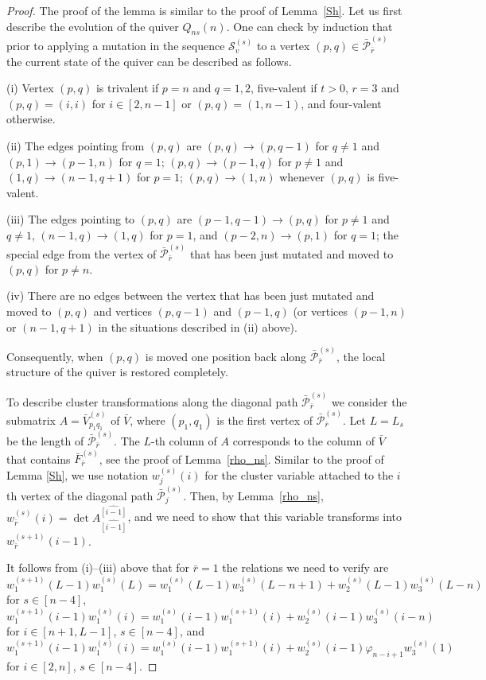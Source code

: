 \documentclass{amsart}
\theoremstyle{definition}
\theoremstyle{remark}
\numberwithin{equation}{section}
\numberwithin{theorem}{section}
\begin{document}
\begin{proof} The proof of the lemma is similar to the proof of Lemma~\ref{Sh}. 
Let us first describe the evolution of the quiver $Q_{ns}(n)$. One can check by induction that prior to 
applying a mutation in the sequence $\mathcal S_v^{(s)}$ to a vertex $(p,q)\in\bar{{\mathcal P}}_{\bar r}^{(s)}$ the current state of
the quiver can be described as follows.

(i) Vertex $(p,q)$ is trivalent if $p=n$ and $q=1,2$, five-valent if $t>0$, $r=3$ and $(p,q)=(i,i)$ for
$i\in[2,n-1]$ or $(p,q)=(1,n-1)$, and four-valent otherwise.

(ii) The edges pointing from $(p,q)$ are $(p,q)\to (p,q-1)$ for $q\ne 1$ and $(p,1)\to (p-1,n)$ for $q=1$;
$(p,q)\to (p-1,q)$ for $p\ne 1$ and $(1,q)\to (n-1,q+1)$ for $p=1$; $(p,q)\to (1,n)$ whenever $(p,q)$ is
five-valent.
 
(iii) The edges pointing to $(p,q)$ are $(p-1,q-1)\to(p,q)$ for $p\ne 1$ and  $q\ne 1$, 
$(n-1,q)\to(1,q)$ for $p=1$, and $(p-2,n)\to (p,1)$ 
for $q=1$; the special edge from the vertex of $\bar{{\mathcal P}}_{\bar r}^{(s)}$ that has been just mutated and moved to $(p,q)$ for $p\ne n$. 

(iv) There are no edges between the vertex that has been just mutated and moved to $(p,q)$ 
and vertices $(p,q-1)$ and $(p-1,q)$ (or vertices $(p-1,n)$ or $(n-1,
q+1)$ in the situations described in (ii) above).

Consequently, when $(p,q)$ is moved one position back along $\bar{{\mathcal P}}_{\bar r}^{(s)}$, the local structure of the quiver is restored completely. 
   
To describe cluster transformations along the diagonal path $\bar{{\mathcal P}}^{(s)}_{\bar r}$ we consider the  submatrix $A=\bar V_{p_1q_1}^{(s)}$ of $\bar V$, where $(p_1,q_1)$ is the first
vertex of $\bar{{\mathcal P}}_{\bar r}^{(s)}$.  Let $L=L_s$ be the length of $\bar{{\mathcal P}}^{(s)}_{\bar r}$.
 The $L$-th column of $A$ corresponds to 
the column of $\bar V$ that contains $\bar F_{\bar r}^{(s)}$, see the proof of Lemma~\ref{rho_ns}.
Similar to the proof of Lemma \ref{Sh}, we use notation $w^{(s)}_j(i)$ for  the cluster variable
attached to the $i$th vertex of the diagonal path $\bar{{\mathcal P}}^{(s)}_j$.
Then, by Lemma~\ref{rho_ns}, 
$w^{(s)}_{\bar r}(i)=\det A^{\widehat{[i-1]}}_{\widehat{[i-1]}}$, and we need
to show that this variable transforms into $w^{(s+1)}_{\bar r}(i-1)$.

It follows from (i)--(iii) above that for $\bar r=1$ the  relations we need to verify are
$$
w^{(s+1)}_1(L-1)  w^{(s)}_1(L) = w^{(s)}_1(L-1) w^{(s)}_3(L-n+1) +
w^{(s)}_2(L-1 ) w^{(s)}_3(L-n)
$$  
for $s\in [n-4]$,
\begin{equation}\label{probe}
w^{(s+1)}_1(i-1) w^{(s)}_1(i) = w^{(s)}_1(i-1) w^{(s+1)}_1(i) +
w^{(s)}_2(i-1 ) w^{(s)}_3(i-n)
\end{equation}
for $i\in [n+1,L-1]$, $s\in [n-4]$, and
$$
w^{(s+1)}_1(i-1) w^{(s)}_1(i) = w^{(s)}_1(i-1) w^{(s+1)}_1(i) +
w^{(s)}_2(i-1 ) {{\varphi}}_{n-i+1} w^{(s)}_3(1)
$$
for  $i\in [2,n]$, $s\in [n-4]$.


\end{proof}
\end{document}
